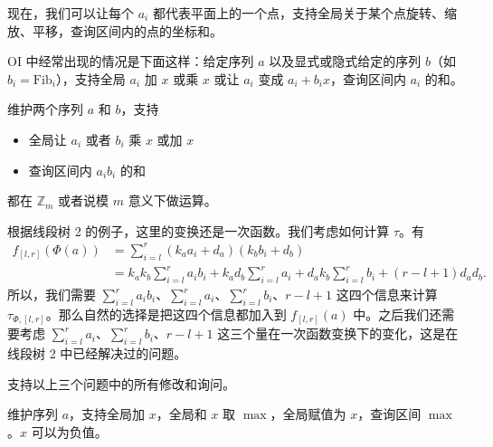 \begin{remark}
    现在，我们可以让每个 $a_i$ 都代表平面上的一个点，支持全局关于某个点旋转、缩放、平移，查询区间内的点的坐标和。
\end{remark}
\begin{exercise}
    OI 中经常出现的情况是下面这样：给定序列 $a$ 以及显式或隐式给定的序列 $b$（如 $b_i=\mathrm{Fib}_i$），支持全局 $a_i$ 加 $x$ 或乘 $x$ 或让 $a_i$ 变成 $a_i+b_ix$，查询区间内 $a_i$ 的和。
\end{exercise}
\begin{example}
    维护两个序列 $a$ 和 $b$，支持
\begin{itemize}
    \item 全局让 $a_i$ 或者 $b_i$ 乘 $x$ 或加 $x$
    \item 查询区间内 $a_ib_i$ 的和
\end{itemize}
    都在 $\mathbb Z_m$ 或者说模 $m$ 意义下做运算。
\end{example}
\begin{solution}
    根据线段树 2 的例子，这里的变换还是一次函数。我们考虑如何计算 $\tau$。有
    $$
    \begin{aligned}
    f_{[l,r]}(\Phi(a))&=\sum_{i=l}^r (k_aa_i+d_a)(k_bb_i+d_b)\\
    &=k_ak_b\sum_{i=l}^r a_ib_i+k_ad_b\sum_{i=l}^r a_i+d_ak_b\sum_{i=l}^r b_i+(r-l+1)d_ad_b.
    \end{aligned}
    $$
    所以，我们需要 $\sum_{i=l}^r a_ib_i$、$\sum_{i=l}^r a_i$、$\sum_{i=l}^r b_i$、$r-l+1$ 这四个信息来计算 $\tau_{\Phi,[l,r]}$。那么自然的选择是把这四个信息都加入到 $f_{[l,r]}(a)$ 中。之后我们还需要考虑 $\sum_{i=l}^r a_i$、$\sum_{i=l}^r b_i$、$r-l+1$ 这三个量在一次函数变换下的变化，这是在线段树 2 中已经解决过的问题。
\end{solution}
\begin{exercise}
    支持以上三个问题中的所有修改和询问。
\end{exercise}
\begin{example}
    维护序列 $a$，支持全局加 $x$，全局和 $x$ 取 $\max$，全局赋值为 $x$，查询区间 $\max$。$x$ 可以为负值。
\end{example}
